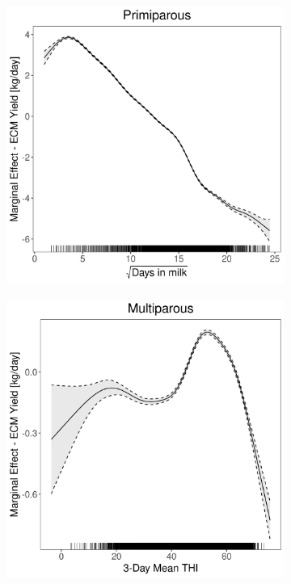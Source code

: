 \begin{figure}[H]
\begin{subfigure}[b]{0.45\textwidth}
    \end{subfigure}
    \hspace{0.05\textwidth} %
    \begin{subfigure}[b]{0.45\textwidth}
        \centering
        \includegraphics[width=\textwidth]{thesis/figures/models/ecm/before2010/ob_ecm_before2010/ob_ecm_before2010_marginal_dim_milk_primi.png}
    \end{subfigure}
    \begin{subfigure}[b]{0.45\textwidth}
        \centering
        \includegraphics[width=\textwidth]{thesis/figures/models/ecm/before2010/ob_ecm_before2010/ob_ecm_before2010_marginal_thi_milk_multi.png}

\end{subfigure}
\end{figure}
